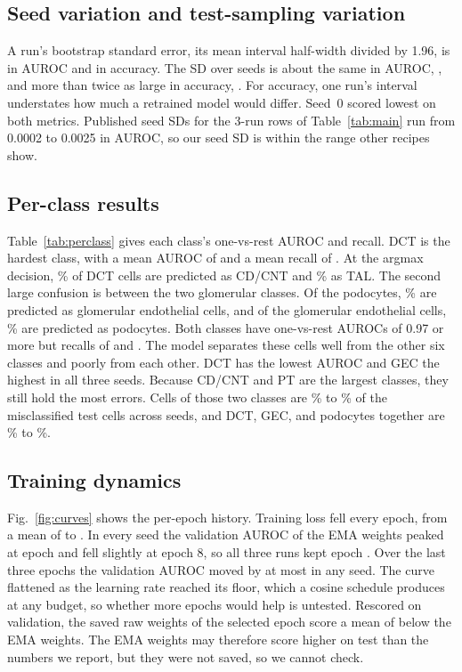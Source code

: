 \documentclass[conference]{IEEEtran}
\begin{document}
\subsection{Seed variation and test-sampling variation}

A run's bootstrap standard error, its mean interval half-width divided by 1.96, is
\testAurocBootSE{} in AUROC and \testAccBootSE{} in accuracy. The SD over seeds is about
the same in AUROC, \testAurocSD{}, and more than twice as large in accuracy,
\testAccSD{}. For accuracy, one run's interval understates how much a retrained model
would differ. Seed~0 scored lowest on both metrics. Published
seed SDs for the 3-run rows of Table~\ref{tab:main} run from 0.0002 to 0.0025 in AUROC, so
our seed SD is within the range other recipes show.

\subsection{Per-class results}
\label{sec:perclass}



Table~\ref{tab:perclass} gives each class's one-vs-rest AUROC and recall. DCT is the
hardest class, with a mean AUROC of \aurocDCTMean{} and a mean recall of
\recallDCTMean{}. At the argmax decision, \confDCTasCDCNT\% of DCT cells are predicted as
CD/CNT and \confDCTasTAL\% as TAL. The second large confusion is between the two glomerular classes. Of the
podocytes, \confPodoasGEC\% are predicted as glomerular endothelial cells, and of the
glomerular endothelial cells, \confGECasPodo\% are predicted as podocytes. Both classes
have one-vs-rest AUROCs of 0.97 or more but recalls of \recallPodoMean{} and
\recallGECMean{}. The model separates these cells well from the other six classes and
poorly from each other. DCT has the lowest AUROC and GEC the highest in all three seeds.
Because CD/CNT and PT are the largest classes, they still hold the most errors. Cells of
those two classes are \errShareCDCNTPTMin\% to \errShareCDCNTPTMax\% of the misclassified
test cells across seeds, and DCT, GEC, and podocytes together are \errShareDCTGlomMin\% to
\errShareDCTGlomMax\%.

\subsection{Training dynamics}
\label{sec:dynamics}

Fig.~\ref{fig:curves} shows the per-epoch history. Training loss fell every epoch, from a
mean of \trainLossFirst{} to \trainLossLast{}. In every seed the validation AUROC of the
EMA weights peaked at epoch \selectedEpoch{} and fell slightly at epoch 8, so all three
runs kept epoch \selectedEpoch{}. Over the last three epochs the validation AUROC moved by
at most \lastThreeSpreadMax{} in any seed. The curve flattened as the learning rate
reached its floor, which a cosine schedule produces at any budget, so whether more epochs
would help is untested. Rescored on validation, the saved raw weights of the selected
epoch score a mean of \emaMinusRawAurocMean{} below the EMA weights. The EMA weights may
therefore score higher on test than the numbers we report, but they were not saved, so we
cannot check.
\end{document}
